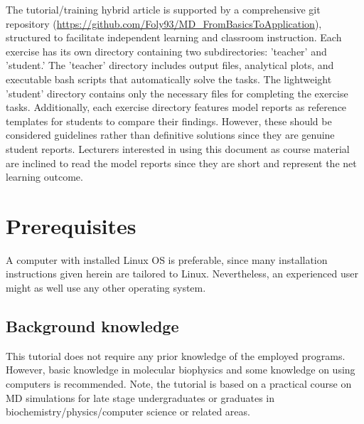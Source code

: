 \documentclass[9pt,tutorial]{livecoms}
\newcommand{\githubrepository}{\url{https://github.com/Foly93/MD_FromBasicsToApplication}}
\begin{document}
The tutorial/training hybrid article is supported by a comprehensive git repository (\githubrepository), structured to facilitate independent learning and classroom instruction. Each exercise has its own directory containing two subdirectories: 'teacher' and 'student.' The 'teacher' directory includes output files, analytical plots, and executable bash scripts that automatically solve the tasks. The lightweight 'student' directory contains only the necessary files for completing the exercise tasks. Additionally, each exercise directory features model reports as reference templates for students to compare their findings. However, these should be considered guidelines rather than definitive solutions since they are genuine student reports. Lecturers interested in using this document as course material are inclined to read the model reports since they are short and represent the net learning outcome.

\newpage

\section{Prerequisites}
A computer with installed Linux OS is preferable, since many installation instructions given herein are tailored to Linux. Nevertheless, an experienced user might as well use any other operating system.


\subsection{Background knowledge}
This tutorial does not require any prior knowledge of the employed programs. However, basic knowledge in molecular biophysics and some knowledge on using computers is recommended. Note, the tutorial is based on a practical course on MD simulations for late stage undergraduates or graduates in biochemistry/physics/computer science or related areas.
\end{document}
